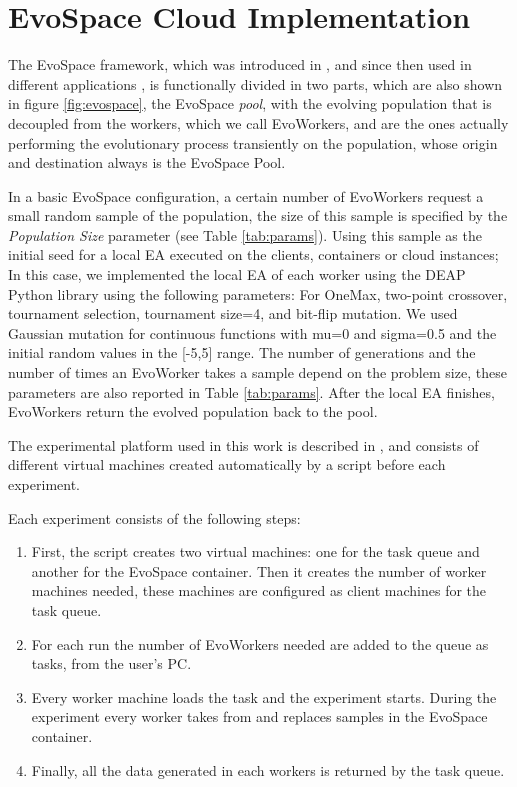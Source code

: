 \documentclass[conference]{IEEEtran}
\begin{document}
\section{EvoSpace Cloud Implementation}
\label{sec:evo}

The EvoSpace framework, which was introduced in \cite{Evospace}, and
since then used in different applications
\cite{GValdez2015,garcia2017evospace}, is functionally divided in two
parts, which are also shown in figure \ref{fig:evospace}, the EvoSpace
{\em pool}, with the evolving population that is decoupled from the
workers, which we call EvoWorkers, and are the ones actually
performing the evolutionary process transiently on the population,
whose origin and destination always is the EvoSpace Pool.

In a basic EvoSpace configuration, a certain number of EvoWorkers request a small random sample of the
population, the size of this sample is specified by the {\em Population Size} parameter (see Table \ref{tab:params}).
Using this sample as the initial seed for a local EA executed
on the clients, containers or cloud instances;  In this case, we implemented the 
local EA of each worker using the DEAP Python
library \cite{fortin2012deap} using the following parameters: For OneMax, two-point crossover,
tournament selection, tournament size=4, and bit-flip mutation.  We used
Gaussian mutation for continuous functions with mu=0 and sigma=0.5 and the
initial random values in the [-5,5] range. The number of generations and 
the number of times an EvoWorker takes a sample depend on the problem size,
these parameters are also reported in Table \ref{tab:params}. After the 
local EA finishes, EvoWorkers return the evolved population back to the pool. 

The experimental platform used in this work is
described in \cite{valenzuela2015implementing}, and consists of different virtual machines
created automatically by a script before each experiment.

Each experiment consists of the following steps:

\begin{enumerate}
    \item First, the script creates two virtual machines: one for the task queue and another
    for the EvoSpace container. Then it creates the number of worker machines needed, these
    machines are configured as client machines for the task queue.
    \item For each run the number of EvoWorkers needed are added to the queue as tasks, from
    the user's PC.
    \item Every worker machine loads the task and the experiment
      starts. During the experiment every worker takes from and replaces
      samples in the EvoSpace container.
    \item Finally, all the data generated in each workers is returned by the task queue.
    \end{enumerate}
\end{document}
